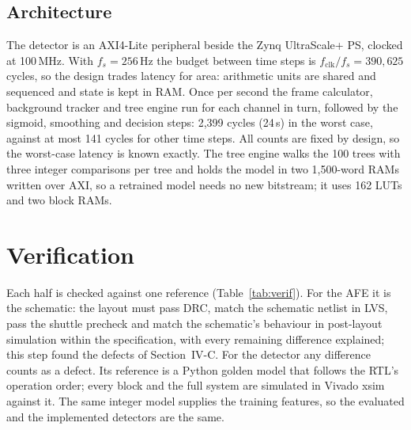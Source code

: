 \documentclass[conference]{IEEEtran}
\begin{document}
\subsection{Architecture}

The detector is an AXI4-Lite peripheral beside the Zynq UltraScale+ PS, clocked at 100\,MHz. With $f_s = 256$\,Hz the budget between time steps is $f_\mathrm{clk}/f_s = 390{,}625$ cycles, so the design trades latency for area: arithmetic units are shared and sequenced and state is kept in RAM. Once per second the frame calculator, background tracker and tree engine run for each channel in turn, followed by the sigmoid, smoothing and decision steps: 2,399 cycles (24\,\textmu s) in the worst case, against at most 141 cycles for other time steps. All counts are fixed by design, so the worst-case latency is known exactly. The tree engine walks the 100 trees with three integer comparisons per tree and holds the model in two 1,500-word RAMs written over AXI, so a retrained model needs no new bitstream; it uses 162 LUTs and two block RAMs.

\section{Verification}

Each half is checked against one reference (Table~\ref{tab:verif}). For the AFE it is the schematic: the layout must pass DRC, match the schematic netlist in LVS, pass the shuttle precheck and match the schematic's behaviour in post-layout simulation within the specification, with every remaining difference explained; this step found the defects of Section~IV-C. For the detector any difference counts as a defect. Its reference is a Python golden model that follows the RTL's operation order; every block and the full system are simulated in Vivado xsim against it. The same integer model supplies the training features, so the evaluated and the implemented detectors are the same.
\end{document}
